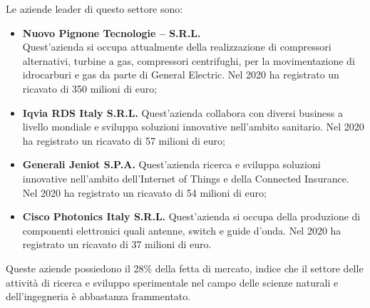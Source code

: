 Le aziende leader di questo settore sono:
\begin{itemize}
	\item \textbf{Nuovo Pignone Tecnologie – S.R.L.}\\
	Quest’azienda si occupa attualmente della realizzazione di compressori alternativi, turbine a gas, compressori centrifughi, per la movimentazione di idrocarburi e gas da parte di General Electric.
	Nel 2020 ha registrato un ricavato di 350 milioni di euro;
	
	\item \textbf{Iqvia RDS Italy S.R.L.}
	Quest’azienda collabora con diversi business a livello mondiale e sviluppa soluzioni innovative nell’ambito sanitario.
	Nel 2020 ha registrato un ricavato di 57 milioni di euro;
	
	\item \textbf{Generali Jeniot S.P.A.}
	Quest’azienda ricerca e sviluppa soluzioni innovative nell’ambito dell’Internet of Things e della Connected Insurance.
	Nel 2020 ha registrato un ricavato di 54 milioni di euro;
	
	\item \textbf{Cisco Photonics Italy S.R.L.}
	Quest’azienda si occupa della produzione di componenti elettronici quali antenne, switch e guide d’onda.
	Nel 2020 ha registrato un ricavato di 37 milioni di euro.	
\end{itemize}

Queste aziende possiedono il 28\% della fetta di mercato, indice che il settore delle attività di ricerca e sviluppo sperimentale nel campo delle scienze naturali e dell’ingegneria è abbastanza frammentato.

